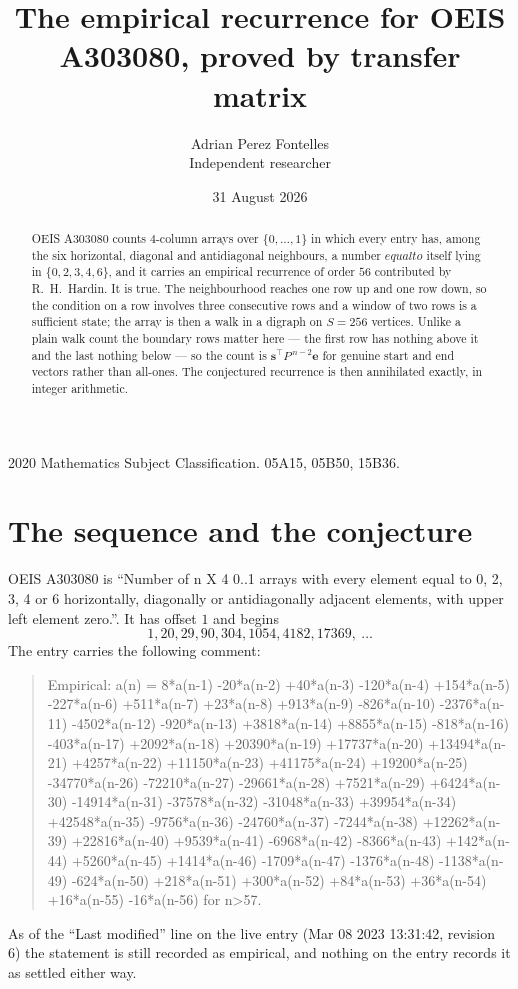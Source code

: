\documentclass[11pt,a4paper]{article}
\title{The empirical recurrence for OEIS A303080, proved by transfer matrix}
\author{Adrian Perez Fontelles\\ \small Independent researcher}
\date{31 August 2026}
\theoremstyle{plain}
\theoremstyle{definition}
\begin{document}
\maketitle

\begin{abstract}
OEIS A303080 counts $4$-column arrays over $\{0,\dots,1\}$ in which every entry has,
among the six horizontal, diagonal and antidiagonal neighbours, a number $equal to$ itself lying in $\{0,2,3,4,6\}$, and it carries an empirical
recurrence of order $56$ contributed by R.~H.~Hardin. It is true. The neighbourhood
reaches one row up and one row down, so the condition on a row involves three consecutive
rows and a window of two rows is a sufficient state; the array is then a walk in a digraph
on $S=256$ vertices. Unlike a plain walk count the boundary rows matter here --- the first
row has nothing above it and the last nothing below --- so the count is
$\mathbf{s}^{\!\top}P^{\,n-2}\mathbf{e}$ for genuine start and end vectors rather than
all-ones. The conjectured recurrence is then annihilated exactly, in integer arithmetic.
\end{abstract}

\noindent\small 2020 Mathematics Subject Classification. 05A15, 05B50, 15B36.\normalsize

\section{The sequence and the conjecture}

OEIS A303080 is ``Number of n X 4 0..1 arrays with every element equal to 0, 2, 3, 4 or 6 horizontally, diagonally or antidiagonally adjacent elements, with upper left element zero.''. It has offset
$1$ and begins
\[
1, 20, 29, 90, 304, 1054, 4182, 17369,\ \dots
\]
The entry carries the following comment:
\begin{quote}\small
Empirical: a(n) = 8*a(n-1) -20*a(n-2) +40*a(n-3) -120*a(n-4) +154*a(n-5) -227*a(n-6) +511*a(n-7) +23*a(n-8) +913*a(n-9) -826*a(n-10) -2376*a(n-11) -4502*a(n-12) -920*a(n-13) +3818*a(n-14) +8855*a(n-15) -818*a(n-16) -403*a(n-17) +2092*a(n-18) +20390*a(n-19) +17737*a(n-20) +13494*a(n-21) +4257*a(n-22) +11150*a(n-23) +41175*a(n-24) +19200*a(n-25) -34770*a(n-26) -72210*a(n-27) -29661*a(n-28) +7521*a(n-29) +6424*a(n-30) -14914*a(n-31) -37578*a(n-32) -31048*a(n-33) +39954*a(n-34) +42548*a(n-35) -9756*a(n-36) -24760*a(n-37) -7244*a(n-38) +12262*a(n-39) +22816*a(n-40) +9539*a(n-41) -6968*a(n-42) -8366*a(n-43) +142*a(n-44) +5260*a(n-45) +1414*a(n-46) -1709*a(n-47) -1376*a(n-48) -1138*a(n-49) -624*a(n-50) +218*a(n-51) +300*a(n-52) +84*a(n-53) +36*a(n-54) +16*a(n-55) -16*a(n-56) for n>57.
\end{quote}
As of the ``Last modified'' line on the live entry (Mar 08 2023 13:31:42, revision
6) the statement is still recorded as empirical, and nothing on the entry
records it as settled either way.
\end{document}
